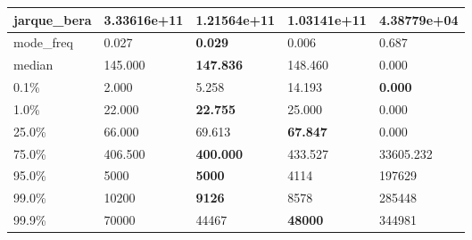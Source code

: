 \begin{table}[H]
\begin{tabular}{|l|m{10em}|m{10em}|m{10em}|m{10em}|}
\hline jarque\_bera & 3.33616e+11 & \bfseries 1.21564e+11 & 1.03141e+11 & \cellcolor[rgb]{0.9, 0.54, 0.52} 4.38779e+04 \\
\hline mode\_freq & 0.027 & \bfseries 0.029 & 0.006 & \cellcolor[rgb]{0.9, 0.54, 0.52} 0.687 \\
\hline median & 145.000 & \bfseries 147.836 & 148.460 & \cellcolor[rgb]{0.9, 0.54, 0.52} 0.000 \\
\hline 0.1\% & 2.000 & 5.258 & \cellcolor[rgb]{0.9, 0.54, 0.52} 14.193 & \bfseries 0.000 \\
\hline 1.0\% & 22.000 & \bfseries 22.755 & 25.000 & \cellcolor[rgb]{0.9, 0.54, 0.52} 0.000 \\
\hline 25.0\% & 66.000 & 69.613 & \bfseries 67.847 & \cellcolor[rgb]{0.9, 0.54, 0.52} 0.000 \\
\hline 75.0\% & 406.500 & \bfseries 400.000 & 433.527 & \cellcolor[rgb]{0.9, 0.54, 0.52} 33605.232 \\
\hline 95.0\% & 5000 & \bfseries 5000 & 4114 & \cellcolor[rgb]{0.9, 0.54, 0.52} 197629 \\
\hline 99.0\% & 10200 & \bfseries 9126 & 8578 & \cellcolor[rgb]{0.9, 0.54, 0.52} 285448 \\
\hline 99.9\% & 70000 & 44467 & \bfseries 48000 & \cellcolor[rgb]{0.9, 0.54, 0.52} 344981 \\
\hline
\end{tabular}
\end{table}
